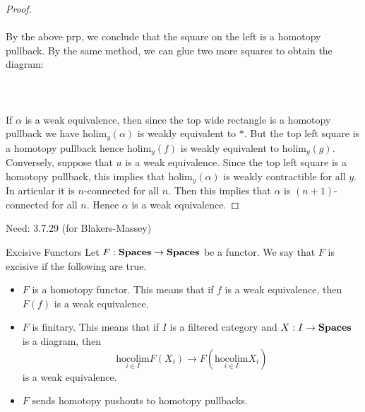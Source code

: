 \documentclass[a4paper]{article}
\begin{document}
\begin{prp}{}{}
\begin{proof}
\\~\\
By the above prp, we conclude that the square on the left is a homotopy pullback. By the same method, we can glue two more squares to obtain the diagram: \\~\\
\\~\\
If $\alpha$ is a weak equivalence, then since the top wide rectangle is a homotopy pullback we have $\text{holim}_y(\alpha)$ is weakly equivalent to $\ast$. But the top left square is a homotopy pullback hence $\text{holim}_y(f)$ is weakly equivalent to $\text{holim}_y(g)$. Conversely, suppose that $u$ is a weak equivalence. Since the top left square is a homotopy pullback, this implies that $\text{holim}_y(\alpha)$ is weakly contractible for all $y$. In articular it is $n$-connected for all $n$. Then this implies that $\alpha$ is $(n+1)$-connected for all $n$. Hence $\alpha$ is a weak equivalence. 
\end{proof}
\end{prp}

Need: 3.7.29 (for Blakers-Massey)

\begin{defn}{Excisive Functors}{} Let $F:\bold{Spaces}\to\bold{Spaces}$ be a functor. We say that $F$ is excisive if the following are true. 
\begin{itemize}
\item $F$ is a homotopy functor. This means that if $f$ is a weak equivalence, then $F(f)$ is a weak equivalence. 
\item $F$ is finitary. This means that if $I$ is a filtered category and $X:I\to\bold{Spaces}$ is a diagram, then $$\underset{i\in I}{\text{hocolim}}F(X_i)\to F\left(\underset{i\in I}{\text{hocolim}}X_i\right)$$ is a weak equivalence. 
\item $F$ sends homotopy pushouts to homotopy pullbacks. 
\end{itemize}
\end{defn}
\end{document}
